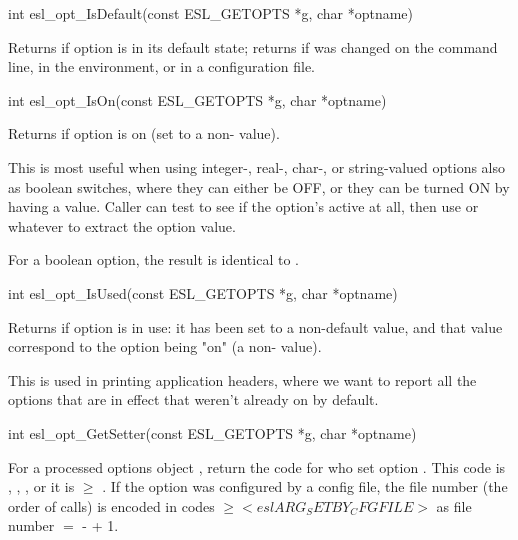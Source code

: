 \begin{sreapi}
\hypertarget{func:esl_opt_IsDefault()}
{\item[int esl\_opt\_IsDefault(const ESL\_GETOPTS *g, char *optname)]}

Returns  if option  is in its
default state; returns  if  was 
changed on the command line, in the environment, or in 
a configuration file.


\hypertarget{func:esl_opt_IsOn()}
{\item[int esl\_opt\_IsOn(const ESL\_GETOPTS *g, char *optname)]}

Returns  if option is on (set to a non-
value). 

This is most useful when using integer-, real-, char-,
or string-valued options also as boolean switches, where
they can either be OFF, or they can be turned ON by
having a value. Caller can test  to see
if the option's active at all, then use
 or whatever to extract the option
value.

For a boolean option, the result is identical to
.



\hypertarget{func:esl_opt_IsUsed()}
{\item[int esl\_opt\_IsUsed(const ESL\_GETOPTS *g, char *optname)]}

Returns  if option  is in use: it has been
set to a non-default value, and that value correspond to
the option being "on" (a non- value).

This is used in printing application headers, where
we want to report all the options that are in effect that
weren't already on by default.



\hypertarget{func:esl_opt_GetSetter()}
{\item[int esl\_opt\_GetSetter(const ESL\_GETOPTS *g, char *optname)]}

For a processed options object , return the code
for who set option . This code is ,
, , or it
is $\geq$ . If the option 
was configured by a config file, the file number (the order
of  calls) is encoded in codes
$\geq <eslARG_SETBY_CFGFILE>$ as
file number $=$  -  + 1.



\end{sreapi}
